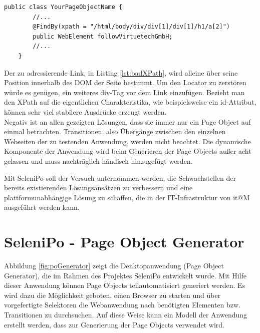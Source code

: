 \begin{lstlisting}[caption={Einfacher XPath-Locator des Projektes OHMAP},label={lst:badXPath}]
	public class YourPageObjectName {
		//...		
 		@FindBy(xpath = "/html/body/div/div[1]/div[1]/h1/a[2]")
		public WebElement followVirtuetechGmbH;	
		//...
	}
\end{lstlisting}

Der zu adressierende Link, in Listing \ref{lst:badXPath}, wird alleine über seine Position innerhalb des DOM der Seite bestimmt.
Um den Locator zu zerstören würde es genügen, ein weiteres div-Tag vor dem Link einzufügen. Bezieht man den XPath auf die eigentlichen Charakteristika, wie beispielsweise ein id-Attribut, können sehr viel stabilere Ausdrücke erzeugt werden.
\\
Negativ ist an allen gezeigten Lösungen, dass sie immer nur ein Page Object auf einmal betrachten. Transitionen, also Übergänge zwischen den einzelnen Webseiten der zu testenden Anwendung, werden nicht beachtet. Die dynamische Komponente der Anwendung wird beim Generieren der Page Objects außer acht gelassen und muss nachträglich händisch hinzugefügt werden.

Mit SeleniPo soll der Versuch unternommen werden, die Schwachstellen der bereits existierenden Lösungsansätzen zu verbessern und eine plattformunabhängige Lösung zu schaffen, die in der IT-Infrastruktur von it@M ausgeführt werden kann.

\newpage
\section{SeleniPo - Page Object Generator}
\label{sec:selenipo_pogenerator}

Abbildung \ref{fig:poGenerator} zeigt die Denktopanwendung (Page Object Generator), die im Rahmen des Projektes SeleniPo entwickelt wurde. Mit Hilfe dieser Anwendung können Page Objects teilautomatisiert generiert werden. Es wird dazu die Möglichkeit geboten, einen Browser zu starten und über vorgefertigte Selektoren die Webanwendung nach benötigten Elementen bzw. Transitionen zu durchsuchen. Auf diese Weise kann ein Modell der Anwendung erstellt werden, dass zur Generierung der Page Objects verwendet wird.


